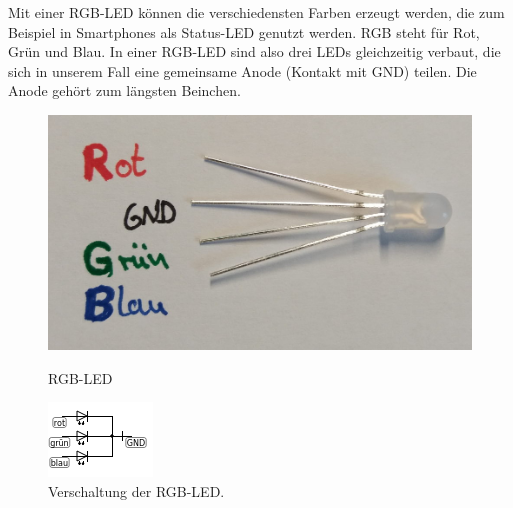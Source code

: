\newpage
\begin{projekt}\label{proj:rgbled1}
	
	\smallskip
	\begin{minipage}{0.45\textwidth}
		Mit einer RGB-LED können die verschiedensten Farben erzeugt werden, die zum Beispiel in Smartphones als Status-LED genutzt werden. RGB steht für Rot, Grün und Blau. In einer RGB-LED sind also drei LEDs gleichzeitig verbaut, die sich in unserem Fall eine gemeinsame Anode (Kontakt mit GND) teilen. Die Anode gehört zum längsten Beinchen.
	\end{minipage}
	\hfill
	\begin{minipage}{0.5\textwidth}
		\begin{figure}[H]
			\hfill
			\begin{minipage}{0.48\textwidth}
				\includegraphics[width=\textwidth]{pics/rgb-led.jpg}
				\caption{RGB-LED}
			\end{minipage}
			\hfill
			\begin{minipage}{0.48\textwidth}
				\includegraphics[width=\textwidth]{pics/rgb-led-schaltplan.png}
				\caption{Verschaltung der RGB-LED.}
			\end{minipage}
			\hfill
			\label{abb:rgb-led}
		\end{figure}
	\end{minipage}
	\bigskip
	

\end{projekt}

